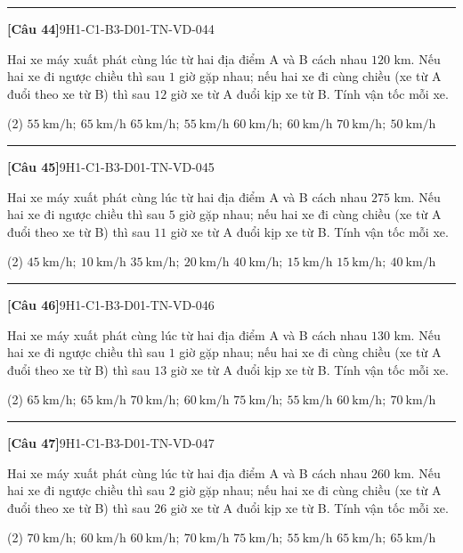 \documentclass[12pt,a4paper]{article}
\newif\ifloigiai
\newenvironment{cauhoi}[2]{%
  \par\medskip\noindent\rule{\textwidth}{0.4pt}\par\nopagebreak
  \noindent\textbf{[#1]}\hfill{\scriptsize\ttfamily #2}\par\nopagebreak\smallskip}{\par}
\newcommand{\dapan}[1]{\ifloigiai\par\smallskip\noindent\textit{Đáp án:} \textbf{#1}\par\fi}
\begin{document}
\begin{cauhoi}{Câu 44}{9H1-C1-B3-D01-TN-VD-044}
Hai xe máy xuất phát cùng lúc từ hai địa điểm A và B cách nhau $120$ km. Nếu hai xe đi ngược chiều thì sau $1$ giờ gặp nhau; nếu hai xe đi cùng chiều (xe từ A đuổi theo xe từ B) thì sau $12$ giờ xe từ A đuổi kịp xe từ B. Tính vận tốc mỗi xe.
\begin{tasks}(2)
\task $55\ \text{km/h};\ 65\ \text{km/h}$
\task $65\ \text{km/h};\ 55\ \text{km/h}$
\task $60\ \text{km/h};\ 60\ \text{km/h}$
\task $70\ \text{km/h};\ 50\ \text{km/h}$
\end{tasks}
\dapan{B}
\end{cauhoi}
\begin{cauhoi}{Câu 45}{9H1-C1-B3-D01-TN-VD-045}
Hai xe máy xuất phát cùng lúc từ hai địa điểm A và B cách nhau $275$ km. Nếu hai xe đi ngược chiều thì sau $5$ giờ gặp nhau; nếu hai xe đi cùng chiều (xe từ A đuổi theo xe từ B) thì sau $11$ giờ xe từ A đuổi kịp xe từ B. Tính vận tốc mỗi xe.
\begin{tasks}(2)
\task $45\ \text{km/h};\ 10\ \text{km/h}$
\task $35\ \text{km/h};\ 20\ \text{km/h}$
\task $40\ \text{km/h};\ 15\ \text{km/h}$
\task $15\ \text{km/h};\ 40\ \text{km/h}$
\end{tasks}
\dapan{C}
\end{cauhoi}
\begin{cauhoi}{Câu 46}{9H1-C1-B3-D01-TN-VD-046}
Hai xe máy xuất phát cùng lúc từ hai địa điểm A và B cách nhau $130$ km. Nếu hai xe đi ngược chiều thì sau $1$ giờ gặp nhau; nếu hai xe đi cùng chiều (xe từ A đuổi theo xe từ B) thì sau $13$ giờ xe từ A đuổi kịp xe từ B. Tính vận tốc mỗi xe.
\begin{tasks}(2)
\task $65\ \text{km/h};\ 65\ \text{km/h}$
\task $70\ \text{km/h};\ 60\ \text{km/h}$
\task $75\ \text{km/h};\ 55\ \text{km/h}$
\task $60\ \text{km/h};\ 70\ \text{km/h}$
\end{tasks}
\dapan{B}
\end{cauhoi}
\begin{cauhoi}{Câu 47}{9H1-C1-B3-D01-TN-VD-047}
Hai xe máy xuất phát cùng lúc từ hai địa điểm A và B cách nhau $260$ km. Nếu hai xe đi ngược chiều thì sau $2$ giờ gặp nhau; nếu hai xe đi cùng chiều (xe từ A đuổi theo xe từ B) thì sau $26$ giờ xe từ A đuổi kịp xe từ B. Tính vận tốc mỗi xe.
\begin{tasks}(2)
\task $70\ \text{km/h};\ 60\ \text{km/h}$
\task $60\ \text{km/h};\ 70\ \text{km/h}$
\task $75\ \text{km/h};\ 55\ \text{km/h}$
\task $65\ \text{km/h};\ 65\ \text{km/h}$
\end{tasks}
\dapan{A}
\end{cauhoi}
\end{document}

